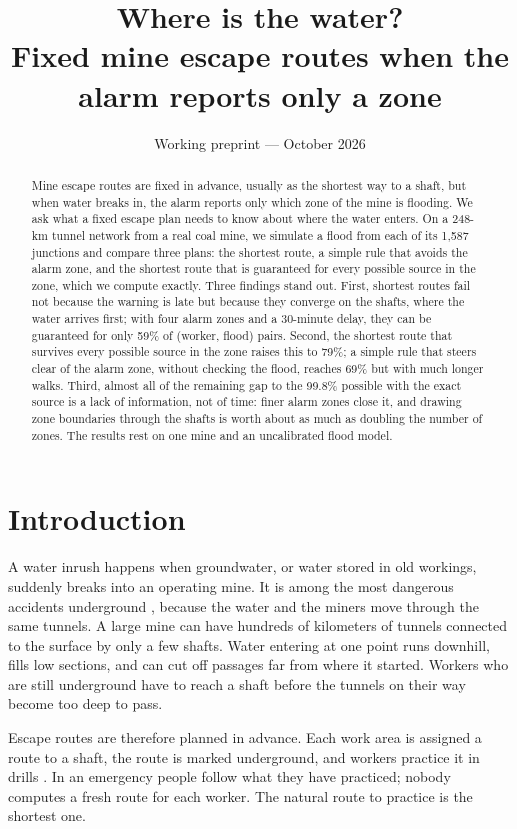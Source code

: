 \documentclass[11pt,a4paper]{article}
\title{Where is the water?\\Fixed mine escape routes when the alarm reports only a zone}
\author{}
\date{Working preprint --- October 2026}
\begin{document}
\maketitle
\begin{abstract}
Mine escape routes are fixed in advance, usually as the shortest way to a shaft, but when water breaks in, the alarm reports only which zone of the mine is flooding. We ask what a fixed escape plan needs to know about where the water enters. On a 248-km tunnel network from a real coal mine, we simulate a flood from each of its 1,587 junctions and compare three plans: the shortest route, a simple rule that avoids the alarm zone, and the shortest route that is guaranteed for every possible source in the zone, which we compute exactly. Three findings stand out. First, shortest routes fail not because the warning is late but because they converge on the shafts, where the water arrives first; with four alarm zones and a 30-minute delay, they can be guaranteed for only 59\% of (worker, flood) pairs. Second, the shortest route that survives every possible source in the zone raises this to 79\%; a simple rule that steers clear of the alarm zone, without checking the flood, reaches 69\% but with much longer walks. Third, almost all of the remaining gap to the 99.8\% possible with the exact source is a lack of information, not of time: finer alarm zones close it, and drawing zone boundaries through the shafts is worth about as much as doubling the number of zones. The results rest on one mine and an uncalibrated flood model.
\end{abstract}

\section{Introduction}
A water inrush happens when groundwater, or water stored in old workings, suddenly breaks into an operating mine. It is among the most dangerous accidents underground \cite{cumcm,sun2016,sun2024}, because the water and the miners move through the same tunnels. A large mine can have hundreds of kilometers of tunnels connected to the surface by only a few shafts. Water entering at one point runs downhill, fills low sections, and can cut off passages far from where it started. Workers who are still underground have to reach a shaft before the tunnels on their way become too deep to pass.

Escape routes are therefore planned in advance. Each work area is assigned a route to a shaft, the route is marked underground, and workers practice it in drills \cite{nrc2013}. In an emergency people follow what they have practiced; nobody computes a fresh route for each worker. The natural route to practice is the shortest one.
\end{document}
